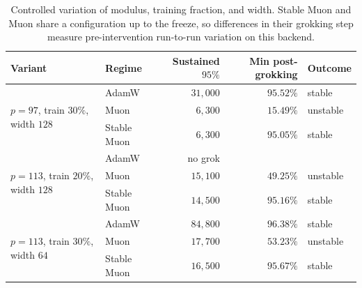 \begin{table}[t]
\centering\small
\caption{Controlled variation of modulus, training fraction, and width. Stable Muon and
Muon share a configuration up to the freeze, so differences in their grokking step measure
pre-intervention run-to-run variation on this backend.}
\label{tab:generality}
\begin{tabular}{llrrl}
\toprule
Variant & Regime & Sustained $95\%$ & Min post-grokking & Outcome \\
\midrule
\multirow{3}{*}{$p=97$, train $30\%$, width $128$}
 & AdamW & $31{,}000$ & $95.52\%$ & stable \\
 & Muon & $6{,}300$ & $15.49\%$ & unstable \\
 & Stable Muon & $6{,}300$ & $95.05\%$ & stable \\
\midrule
\multirow{3}{*}{$p=113$, train $20\%$, width $128$}
 & AdamW & no grok & & \\
 & Muon & $15{,}100$ & $49.25\%$ & unstable \\
 & Stable Muon & $14{,}500$ & $95.16\%$ & stable \\
\midrule
\multirow{3}{*}{$p=113$, train $30\%$, width $64$}
 & AdamW & $84{,}800$ & $96.38\%$ & stable \\
 & Muon & $17{,}700$ & $53.23\%$ & unstable \\
 & Stable Muon & $16{,}500$ & $95.67\%$ & stable \\
\bottomrule
\end{tabular}
\end{table}
